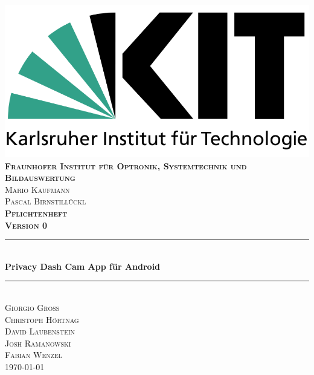 \begin{titlepage}

\begin{center}

\includegraphics[width=0.5\linewidth]{subtopicsFuncspec/Res/KITLogo.png}\\[0.5cm]
  

\textsc{\bfseries Fraunhofer Institut für Optronik, Systemtechnik und Bildauswertung}\\[0.5cm]
\textsc{Mario Kaufmann\\Pascal Birnstill\"uckl}\\[2cm]

\textsc{\LARGE \bfseries Pflichtenheft}\\[0.5cm]
\textsc{\bfseries Version 0}\\[0.2cm]


\newcommand{\HRule}{\rule{\linewidth}{0.5mm}} 
{\color{mintgreen}\HRule} \\[0.4cm]
{\huge \bfseries Privacy Dash Cam App für Android}\\[0.4cm]
{\color{mintgreen}\HRule} \\[1cm]

\textsc{\Large Giorgio Groß\\Christoph Hörtnag\\David Laubenstein\\Josh Ramanowski\\Fabian Wenzel} \\[2cm]

{\large \today}

\end{center}

\end{titlepage}